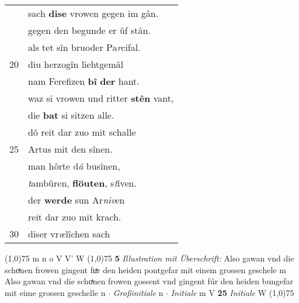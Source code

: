 \documentclass[8pt,a4paper,notitlepage]{article}
\begin{document}
\begin{table}[ht]
\begin{minipage}[t]{0.5\linewidth}
\begin{tabular}{rl}
 & sach \textbf{dise} vrowen gegen im gân.\\ 
 & gegen den begunde er ûf stân.\\ 
 & als tet sîn bruoder Pa\textit{r}cifal.\\ 
20 & diu herzogîn liehtgemâl\\ 
 & nam Ferefizen \textbf{bî} \textbf{der} hant.\\ 
 & waz si vrowen und ritter \textbf{stên} vant,\\ 
 & die \textbf{bat} si sitzen alle.\\ 
 & dô reit dar zuo mit schalle\\ 
25 & Artus mit den sînen.\\ 
 & man hôrte d\textit{â} busînen,\\ 
 & \textit{t}ambûren, \textbf{flöuten}, s\textit{t}îven.\\ 
 & der \textbf{werde} sun Ar\textit{niv}en\\ 
 & reit dar zuo mit krach.\\ 
30 & diser vr\textit{œ}lîchen sach\\ 
\end{tabular}
\scriptsize
\line(1,0){75} \newline
m n o V V' W \newline
\line(1,0){75} \newline
\textbf{5} \textit{Illustration mit Überschrift:} Also gawan vnd die schoͯnen frowen gingent fuͯr den heiden pontgefar mit einem grossen geschele m  Also gawan vnd die schoͯnen frowen gossent vnd gingent fúr den heiden bungefar mit eime grossen geschelle n   $\cdot$ \textit{Großinitiale} n   $\cdot$ \textit{Initiale} m V  \textbf{25} \textit{Initiale} W  \newline
\line(1,0){75} \newline

\end{minipage}
\end{table}
\end{document}
